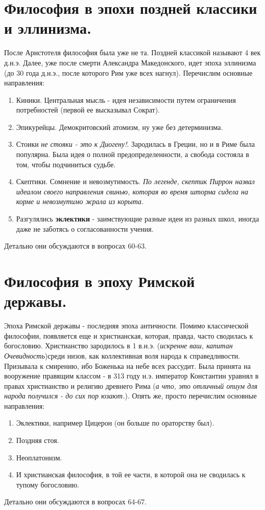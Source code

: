 \documentclass[12pt,a4paper]{article}
\begin{document}
\section{Философия в эпохи поздней классики и эллинизма.}
После Аристотеля философия была уже не та. Поздней классикой называют 4 век д.н.э. Далее, уже после смерти Александра Македонского, идет эпоха эллинизма (до 30 года д.н.э., после которого Рим уже всех нагнул). Перечислим основные направления:
\begin{enumerate}
\item Киники. Центральная мысль - идея независимости путем ограничения потребностей (первой ее высказывал Сократ).
\item Эпикурейцы. Демокритовский атомизм, ну уже без детерминизма.
\item Стоики \textit{не стояки - это к Диогену!}. Зародилась в Греции, но и в Риме была популярна. Была идея о полной предопределенности, а свобода состояла в том, чтобы подчиниться судьбе.
\item Скептики. Сомнение и невозмутимость. \textit{По легенде, скептик Пиррон назвал идеалом своего направления свинью, которая во время шторма сидела на корме и невозмутимо жрала из корыта.}
\item Разгулялись \textbf{эклектики}  - заимствующие разные идеи из разных школ, иногда даже не заботясь о согласованности учения.
\end{enumerate}
Детально они обсуждаются в вопросах 60-63.

\section{Философия в эпоху Римской державы.}
Эпоха Римской державы - последняя эпоха античности. Помимо классической философии, появляется еще и христианская, которая, правда, часто сводилась к богословию. Христианство зародилось в 1 в.н.э. (\textit{искренне ваш, капитан Очевидность})среди низов, как коллективная воля народа к справедливости. Призывала к смирению, ибо Боженька на небе всех рассудит. Была принята на вооружение правящим классом - в 313 году н.э. император Константин уравнял в правах христианство и религию древнего Рима (\textit{а что, это отличный опиум для народа получился - до сих пор юзают.}). Опять же, просто перечислим основные направления:
\begin{enumerate}
\item Эклектики, например Цицерон (он больше по ораторству был).
\item Поздняя стоя. 
\item Неоплатонизм.
\item И христианская философия, в той ее части, в которой она не сводилась к тупому богословию.
\end{enumerate}
Детально они обсуждаются в вопросах 64-67.
\end{document}
